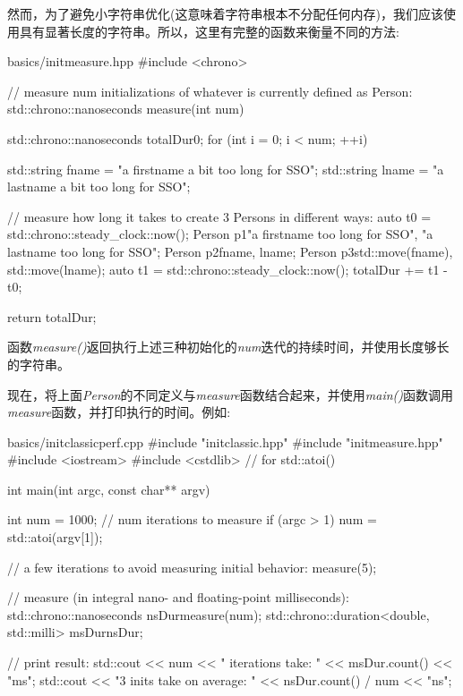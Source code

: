 然而，为了避免小字符串优化(这意味着字符串根本不分配任何内存)，我们应该使用具有显著长度的字符串。所以，这里有完整的函数来衡量不同的方法:\par

\begin{codeboxt}[cpp]{basics/initmeasure.hpp}
#include <chrono>

// measure num initializations of whatever is currently defined as Person:
std::chrono::nanoseconds measure(int num)
{
  std::chrono::nanoseconds totalDur{0};
  for (int i = 0; i < num; ++i) {
    std::string fname = "a firstname a bit too long for SSO";
    std::string lname = "a lastname a bit too long for SSO";

    // measure how long it takes to create 3 Persons in different ways:
    auto t0 = std::chrono::steady_clock::now();
    Person p1{"a firstname too long for SSO", "a lastname too long for SSO"};
    Person p2{fname, lname};
    Person p3{std::move(fname), std::move(lname)};
    auto t1 = std::chrono::steady_clock::now();
    totalDur += t1 - t0;
  }
  return totalDur;
}
\end{codeboxt}

函数\textit{measure()}返回执行上述三种初始化的\textit{num}迭代的持续时间，并使用长度够长的字符串。\par

现在，将上面\textit{Person}的不同定义与\textit{measure}函数结合起来，并使用\textit{main()}函数调用\textit{measure}函数，并打印执行的时间。例如:\par

\begin{codeboxt}[cpp]{basics/initclassicperf.cpp}
#include "initclassic.hpp"
#include "initmeasure.hpp"
#include <iostream>
#include <cstdlib> // for std::atoi()

int main(int argc, const char** argv)
{
  int num = 1000; // num iterations to measure
  if (argc > 1) {
    num = std::atoi(argv[1]);
  }

  // a few iterations to avoid measuring initial behavior:
  measure(5);

  // measure (in integral nano- and floating-point milliseconds):
  std::chrono::nanoseconds nsDur{measure(num)};
  std::chrono::duration<double, std::milli> msDur{nsDur};

  // print result:
  std::cout << num << " iterations take: "
  << msDur.count() << "ms\n";
  std::cout << "3 inits take on average: "
  << nsDur.count() / num << "ns\n";
}
\end{codeboxt}

